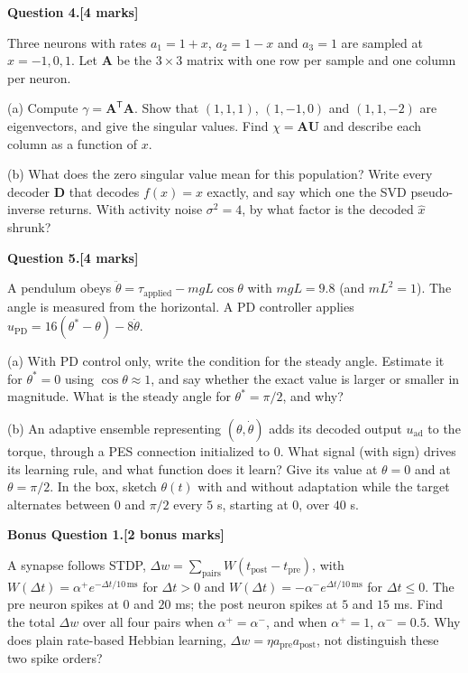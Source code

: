 \documentclass[11pt,letterpaper]{article}
\newcommand{\T}{\mathsf{T}}
\newcommand{\question}[2]{\par\vspace{10pt}\textbf{Question #1.}\hfill\textbf{[#2 marks]}\par}
\newcommand{\answerbox}[1]{\par\noindent\framebox[\linewidth]{\rule{0pt}{#1}}\par}
\begin{document}
\newpage
\question{4}{4}
Three neurons with rates $a_1 = 1 + x$, $a_2 = 1 - x$ and $a_3 = 1$ are sampled at $x = -1, 0, 1$. Let $\mathbf A$ be the $3 \times 3$ matrix with one row per sample and one column per neuron.

(a) Compute $\gamma = \mathbf A^\T\mathbf A$. Show that $(1, 1, 1)$, $(1, -1, 0)$ and $(1, 1, -2)$ are eigenvectors, and give the singular values. Find $\chi = \mathbf A\mathbf U$ and describe each column as a function of $x$.
\vspace{5.4cm}

(b) What does the zero singular value mean for this population? Write every decoder $\mathbf D$ that decodes $f(x) = x$ exactly, and say which one the SVD pseudo-inverse returns. With activity noise $\sigma^2 = 4$, by what factor is the decoded $\hat x$ shrunk?
\answerbox{4.6cm}

\newpage
\question{5}{4}
A pendulum obeys $\ddot\theta = \tau_{\mathrm{applied}} - mgL\cos\theta$ with $mgL = 9.8$ (and $mL^2 = 1$). The angle is measured from the horizontal. A PD controller applies $u_{\mathrm{PD}} = 16(\theta^* - \theta) - 8\dot\theta$.

(a) With PD control only, write the condition for the steady angle. Estimate it for $\theta^* = 0$ using $\cos\theta \approx 1$, and say whether the exact value is larger or smaller in magnitude. What is the steady angle for $\theta^* = \pi/2$, and why?
\vspace{4.6cm}

(b) An adaptive ensemble representing $(\theta, \dot\theta)$ adds its decoded output $u_{\mathrm{ad}}$ to the torque, through a PES connection initialized to $0$. What signal (with sign) drives its learning rule, and what function does it learn? Give its value at $\theta = 0$ and at $\theta = \pi/2$. In the box, sketch $\theta(t)$ with and without adaptation while the target alternates between $0$ and $\pi/2$ every $5$ s, starting at $0$, over $40$ s.
\answerbox{5cm}

\newpage
\textbf{Bonus Question 1.}\hfill\textbf{[2 bonus marks]}\par
A synapse follows STDP, $\Delta w = \sum_{\text{pairs}} W(t_{\mathrm{post}} - t_{\mathrm{pre}})$, with $W(\Delta t) = \alpha^+e^{-\Delta t/10\,\mathrm{ms}}$ for $\Delta t > 0$ and $W(\Delta t) = -\alpha^-e^{\Delta t/10\,\mathrm{ms}}$ for $\Delta t \le 0$. The pre neuron spikes at $0$ and $20$ ms; the post neuron spikes at $5$ and $15$ ms. Find the total $\Delta w$ over all four pairs when $\alpha^+ = \alpha^-$, and when $\alpha^+ = 1$, $\alpha^- = 0.5$. Why does plain rate-based Hebbian learning, $\Delta w = \eta a_{\mathrm{pre}}a_{\mathrm{post}}$, not distinguish these two spike orders?
\vspace{6cm}
\end{document}
